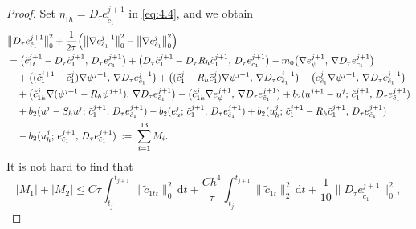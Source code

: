 \documentclass[a4paper,fleqn]{cas-sc}
\numberwithin{equation}{section}
\theoremstyle{definition}
\begin{document}
\begin{proof}
Set $\eta_{1h} = D_{\tau}e_{\tilde{c}_{1}}^{j+1}$ in \eqref{eq:4.4}, and we obtain
\begin{align}
  &\bigl\|D_{\tau}e_{\tilde{c}_{1}}^{j+1}\bigr\|_{0}^{2}
   + \frac{1}{2\tau}\Bigl(\bigl\|\nabla e_{\tilde{c}_{1}}^{j+1}\bigr\|_{0}^{2}
                         - \bigl\|\nabla e_{\tilde{c}_{1}}^{j}\bigr\|_{0}^{2}\Bigr)
  \nonumber\\
  &= \bigl(\tilde{c}_{1t}^{j+1} - D_{\tau}\tilde{c}_{1}^{j+1},\,
           D_{\tau}e_{\tilde{c}_{1}}^{j+1}\bigr)
   + \bigl(D_{\tau}\tilde{c}_{1}^{j+1} - D_{\tau}R_{h}\tilde{c}_{1}^{j+1},\,
           D_{\tau}e_{\tilde{c}_{1}}^{j+1}\bigr)
   - m_{0}\bigl(\nabla e_{\psi}^{j+1},\,
                 \nabla D_{\tau}e_{\tilde{c}_{1}}^{j+1}\bigr)
  \nonumber\\
  &\quad + \bigl((\tilde{c}_{1}^{j+1} - \tilde{c}_{1}^{j})\nabla\psi^{j+1},\,
               \nabla D_{\tau}e_{\tilde{c}_{1}}^{j+1}\bigr)
   + \bigl((\tilde{c}_{1}^{j} - R_{h}\tilde{c}_{1}^{j})\nabla\psi^{j+1},\,
           \nabla D_{\tau}e_{\tilde{c}_{1}}^{j+1}\bigr)
   - \bigl(e_{\tilde{c}_{1}}^{j}\nabla\psi^{j+1},\,
           \nabla D_{\tau}e_{\tilde{c}_{1}}^{j+1}\bigr)
  \nonumber\\
  &\quad + \bigl(\tilde{c}_{1h}^{j}\nabla(\psi^{j+1} - R_{h}\psi^{j+1}),\,
               \nabla D_{\tau}e_{\tilde{c}_{1}}^{j+1}\bigr)
   - \bigl(\tilde{c}_{1h}^{j}\nabla e_{\psi}^{j+1},\,
           \nabla D_{\tau}e_{\tilde{c}_{1}}^{j+1}\bigr)
   + b_{2}(u^{j+1}-u^{j};\, \tilde{c}_{1}^{j+1},\, D_{\tau}e_{\tilde{c}_{1}}^{j+1})
  \nonumber\\
  &\quad + b_{2}(u^{j} - S_{h}u^{j};\, \tilde{c}_{1}^{j+1},\, D_{\tau}e_{\tilde{c}_{1}}^{j+1})
   - b_{2}(e_{u}^{j};\, \tilde{c}_{1}^{j+1},\, D_{\tau}e_{\tilde{c}_{1}}^{j+1})
   + b_{2}(u_{h}^{j};\, \tilde{c}_{1}^{j+1} - R_{h}\tilde{c}_{1}^{j+1},\,
           D_{\tau}e_{\tilde{c}_{1}}^{j+1})
  \nonumber\\
  &\quad - b_{2}(u_{h}^{j};\, e_{\tilde{c}_{1}}^{j+1},\, D_{\tau}e_{\tilde{c}_{1}}^{j+1})
  \;:=\; \sum_{i=1}^{13}M_{i}.
  \label{eq:4.68}
\end{align}
It is not hard to find that
\begin{equation}\label{eq:4.69}
  |M_{1}| + |M_{2}|
  \leq C\tau\int_{t_{j}}^{t_{j+1}}\|\tilde{c}_{1tt}\|_{0}^{2}\,\mathrm{d}t
     + \frac{Ch^{4}}{\tau}\int_{t_{j}}^{t_{j+1}}\|\tilde{c}_{1t}\|_{2}^{2}\,\mathrm{d}t
     + \frac{1}{10}\bigl\|D_{\tau}e_{\tilde{c}_{1}}^{j+1}\bigr\|_{0}^{2},
\end{equation}

\end{proof}
\end{document}
